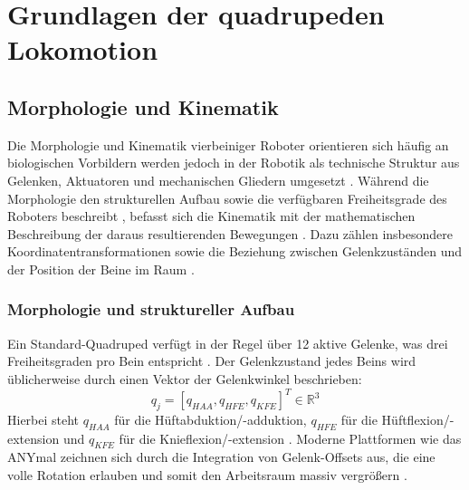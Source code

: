 \section{Grundlagen der quadrupeden Lokomotion}
\subsection{Morphologie und Kinematik}
Die Morphologie und Kinematik vierbeiniger Roboter orientieren sich häufig an biologischen Vorbildern werden jedoch in der Robotik als technische Struktur aus Gelenken, Aktuatoren und mechanischen Gliedern umgesetzt \cite{BISWAL20212017, hutterANYmalHighlyMobile2016}. Während die Morphologie den strukturellen Aufbau sowie die verfügbaren Freiheitsgrade des Roboters beschreibt \cite{BISWAL20212017, heessEmergenceLocomotionBehaviours2017, hutterANYmalHighlyMobile2016}, befasst sich die Kinematik mit der mathematischen Beschreibung der daraus resultierenden Bewegungen \cite{hwangboLearningAgileDynamic2019, bussolaGuidedReinforcementLearning2025, rechtTourReinforcementLearning2018}. Dazu zählen insbesondere Koordinatentransformationen sowie die Beziehung zwischen Gelenkzuständen und der Position der Beine im Raum \cite{hwangboLearningAgileDynamic2019, bussolaGuidedReinforcementLearning2025}.

\subsubsection{Morphologie und struktureller Aufbau}
Ein Standard-Quadruped verfügt in der Regel über 12 aktive Gelenke, was drei Freiheitsgraden pro Bein entspricht \cite{hwangboLearningAgileDynamic2019, BISWAL20212017}. Der Gelenkzustand jedes Beins wird üblicherweise durch einen Vektor der Gelenkwinkel beschrieben:
\begin{equation}
	q_j = [q_{HAA}, q_{HFE}, q_{KFE}]^T \in \mathbb{R}^3
\end{equation}
Hierbei steht $q_{HAA}$ für die Hüftabduktion/-adduktion, $q_{HFE}$ für die Hüftflexion/-extension und $q_{KFE}$ für die Knieflexion/-extension \cite{hwangboLearningAgileDynamic2019, hutterANYmalHighlyMobile2016}. Moderne Plattformen wie das ANYmal zeichnen sich durch die Integration von Gelenk-Offsets aus, die eine volle Rotation erlauben und somit den Arbeitsraum massiv vergrößern \cite{hutterANYmalHighlyMobile2016}.

